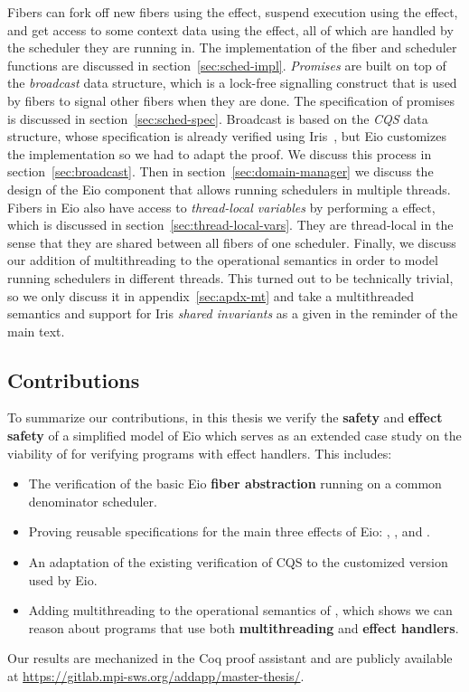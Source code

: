Fibers can fork off new fibers using the \efork{} effect, suspend execution using the \esuspend{} effect, and get access to some context data using the \egetctx{} effect,
all of which are handled by the scheduler they are running in.
The implementation of the fiber and scheduler functions are discussed in section~\ref{sec:sched-impl}.
\emph{Promises} are built on top of the \emph{broadcast} data structure, which is a lock-free signalling construct that is used by fibers to signal other fibers when they are done.
The specification of promises is discussed in section~\ref{sec:sched-spec}.
Broadcast is based on the \emph{CQS} data structure, whose specification is already verified using Iris~\cite{koval2023cqs}, but Eio customizes the implementation so we had to adapt the proof.
We discuss this process in section~\ref{sec:broadcast}.
Then in section~\ref{sec:domain-manager} we discuss the design of the Eio component that allows running schedulers in multiple threads.
Fibers in Eio also have access to \emph{thread-local variables} by performing a \egetctx{} effect, which is discussed in section~\ref{sec:thread-local-vars}.
They are thread-local in the sense that they are shared between all fibers of one scheduler.
Finally, we discuss our addition of multithreading to the \hh{} operational semantics in order to model running schedulers in different threads.
This turned out to be technically trivial, so we only discuss it in appendix~\ref{sec:apdx-mt} and take a multithreaded semantics and support for Iris \emph{shared invariants} as a given in the reminder of the main text.

\subsection{Contributions}
\label{sec:intro-contributions}

To summarize our contributions, in this thesis we verify the \textbf{safety} and \textbf{effect safety} of a simplified model of Eio which serves as an extended case study on the viability of \hazel{} for verifying programs with effect handlers.
This includes:

\begin{itemize}
    \item The verification of the basic Eio \textbf{fiber abstraction} running on a common denominator scheduler.
    \item Proving reusable specifications for the main three effects of Eio: \efork{}, \esuspend{}, and \egetctx{}.
    \item An adaptation of the existing verification of CQS to the customized version used by Eio.
    \item Adding multithreading to the operational semantics of \hh{}, which shows we can reason about programs that use both \textbf{multithreading} and \textbf{effect handlers}.
\end{itemize}

Our results are mechanized in the Coq proof assistant and are publicly available at \url{https://gitlab.mpi-sws.org/addapp/master-thesis/}.
